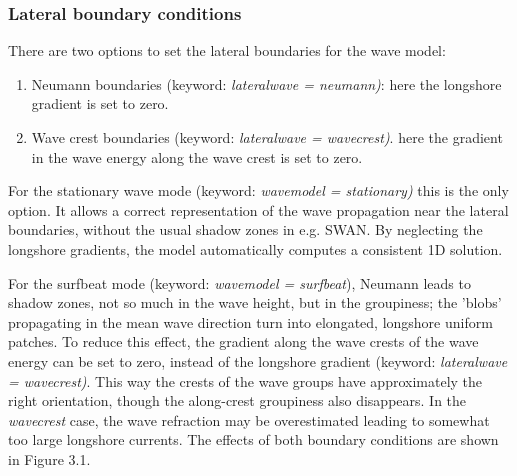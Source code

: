 \documentclass{article}
\begin{document}
\subsubsection{ Lateral boundary conditions}

\noindent There are two options to set the lateral boundaries for the wave model:

\begin{enumerate}
\item  Neumann boundaries (keyword: \textit{lateralwave = neumann)}: here the longshore gradient is set to zero.

\item  Wave crest boundaries (keyword: \textit{lateralwave = wavecrest)}. here the gradient in the wave energy along the wave crest is set to zero.
\end{enumerate}

\noindent 

\noindent For the stationary wave mode (keyword: \textit{wavemodel = stationary)} this is the only option. It allows a correct representation of the wave propagation near the lateral boundaries, without the usual shadow zones in e.g. SWAN. By neglecting the longshore gradients, the model automatically computes a consistent 1D solution. 

\noindent 

\noindent For the surfbeat mode (keyword: \textit{wavemodel = surfbeat}), Neumann leads to shadow zones, not so much in the wave height, but in the groupiness; the 'blobs' propagating in the mean wave direction turn into elongated, longshore uniform patches. To reduce this effect, the gradient along the wave crests of the wave energy can be set to zero, instead of the longshore gradient (keyword: \textit{lateralwave = wavecrest)}. This way the crests of the wave groups have approximately the right orientation, though the along-crest groupiness also disappears. In the \textit{wavecrest} case, the wave refraction may be overestimated leading to somewhat too large longshore currents. The effects of both boundary conditions are shown in Figure 3.1. 
\end{document}
